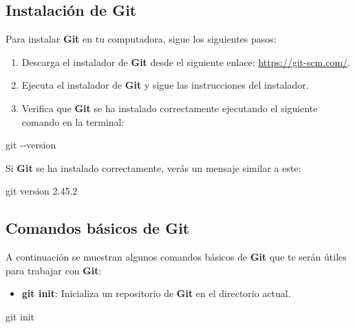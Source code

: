 \documentclass[
  a4paper,
  DIV=11,
  numbers=noendperiod,
  onepage,
  openany]{scrreprt}
\newenvironment{Shaded}{\begin{snugshade}}{\end{snugshade}}
\newcommand{\AttributeTok}[1]{\textcolor[rgb]{0.40,0.45,0.13}{#1}}
\newcommand{\FunctionTok}[1]{\textcolor[rgb]{0.28,0.35,0.67}{#1}}
\newcommand{\NormalTok}[1]{\textcolor[rgb]{0.00,0.23,0.31}{#1}}
\providecommand{\tightlist}{%
  \setlength{\itemsep}{0pt}\setlength{\parskip}{0pt}}\usepackage{longtable,booktabs,array}
\begin{document}
\subsection{Instalación de Git}\label{instalaciuxf3n-de-git}

Para instalar \textbf{Git} en tu computadora, sigue los siguientes
pasos:

\begin{enumerate}
\def\labelenumi{\arabic{enumi}.}
\item
  Descarga el instalador de \textbf{Git} desde el siguiente enlace:
  \url{https://git-scm.com/}.
\item
  Ejecuta el instalador de \textbf{Git} y sigue las instrucciones del
  instalador.
\item
  Verifica que \textbf{Git} se ha instalado correctamente ejecutando el
  siguiente comando en la terminal:
\end{enumerate}

\begin{Shaded}
\begin{Highlighting}[]
\FunctionTok{git} \AttributeTok{{-}{-}version}
\end{Highlighting}
\end{Shaded}

Si \textbf{Git} se ha instalado correctamente, verás un mensaje similar
a este:

\begin{Shaded}
\begin{Highlighting}[]
\FunctionTok{git}\NormalTok{ version 2.45.2}
\end{Highlighting}
\end{Shaded}

\subsection{Comandos básicos de Git}\label{comandos-buxe1sicos-de-git}

A continuación se muestran algunos comandos básicos de \textbf{Git} que
te serán útiles para trabajar con \textbf{Git}:

\begin{itemize}
\tightlist
\item
  \textbf{git init}: Inicializa un repositorio de \textbf{Git} en el
  directorio actual.
\end{itemize}

\begin{Shaded}
\begin{Highlighting}[]
\FunctionTok{git}\NormalTok{ init}
\end{Highlighting}
\end{Shaded}
\end{document}
